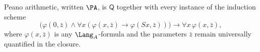 
\begin{definition}
Peano arithmetic, written \(\PA\), is \(\mathsf Q\) together with every
instance of the induction scheme
\[
  \bigl(\varphi(0,\bar z)\land
  \forall x(\varphi(x,\bar z)\to\varphi(Sx,\bar z))\bigr)
  \to\forall x\,\varphi(x,\bar z),
\]
where \(\varphi(x,\bar z)\) is any \(\Lang_A\)-formula and the parameters
\(\bar z\) remain universally quantified in the closure.
\end{definition}


